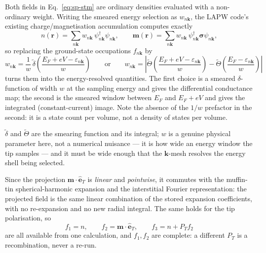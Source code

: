 \documentclass[11pt]{article}
\begin{document}
Both fields in Eq.~\eqref{eq:sp-stm} are ordinary densities evaluated with a
non-ordinary weight. Writing the smeared energy selection as
$w_{n\mathbf k}$, the LAPW code's existing charge/magnetisation accumulation
computes exactly
\begin{equation}
  n(\mathbf r)=\sum_{n\mathbf k}w_{n\mathbf k}\,
    \psi^\dagger_{n\mathbf k}\psi_{n\mathbf k},
  \qquad
  \mathbf m(\mathbf r)=\sum_{n\mathbf k}w_{n\mathbf k}\,
    \psi^\dagger_{n\mathbf k}\boldsymbol\sigma\psi_{n\mathbf k},
  \label{eq:weighted-density}
\end{equation}
so replacing the ground-state occupations $f_{n\mathbf k}$ by
\begin{equation}
  w_{n\mathbf k}=\frac{1}{w}\,\tilde\delta\!\left(\frac{E_F+eV-\varepsilon_{n\mathbf k}}{w}\right)
  \qquad\text{or}\qquad
  w_{n\mathbf k}=\left|\tilde\Theta\!\left(\frac{E_F+eV-\varepsilon_{n\mathbf k}}{w}\right)
   -\tilde\Theta\!\left(\frac{E_F-\varepsilon_{n\mathbf k}}{w}\right)\right|
  \label{eq:stm-weights}
\end{equation}
turns them into the energy-resolved quantities. The first choice is a smeared
$\delta$-function of width $w$ at the sampling energy and gives the
differential conductance map; the second is the smeared window between $E_F$
and $E_F+eV$ and gives the integrated (constant-current) image. Note the
absence of the $1/w$ prefactor in the second: it is a state count per volume,
not a density of states per volume.

$\tilde\delta$ and $\tilde\Theta$ are the smearing function and its integral;
$w$ is a genuine physical parameter here, not a numerical nuisance --- it is
how wide an energy window the tip samples --- and it must be wide enough that
the $\mathbf k$-mesh resolves the energy shell being selected.

Since the projection $\mathbf m\cdot\hat{\mathbf e}_T$ is \emph{linear} and
\emph{pointwise}, it commutes with the muffin-tin spherical-harmonic expansion
and the interstitial Fourier representation: the projected field is the same
linear combination of the stored expansion coefficients, with no re-expansion
and no new radial integral. The same holds for the tip polarisation, so
\begin{equation}
  f_1=n,\qquad f_2=\mathbf m\cdot\hat{\mathbf e}_T,\qquad
  f_3=n+P_T f_2
  \label{eq:stm-fields}
\end{equation}
are all available from one calculation, and $f_1,f_2$ are complete: a
different $P_T$ is a recombination, never a re-run.
\end{document}

